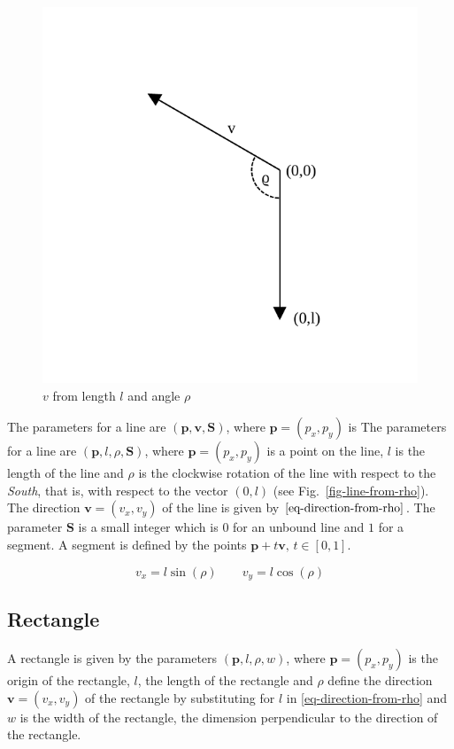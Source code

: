 \documentclass[11pt]{article}
\newcommand{\pb}{\mathbf{p}}
\newcommand{\Sb}{\mathbf{S}}
\newcommand{\vb}{\mathbf{v}}
\newcommand{\figref}[1]{Fig.~\eqref{#1}}
\begin{document}
\begin{figure}
    \centering
    \includegraphics[trim=0 20 0 80]{odg/line-from-angle.pdf}
    \caption{$v$ from length $l$ and angle $\rho$}\label{fig-line-from-rho}
\end{figure}
The parameters for a line are $(\pb, \vb, \Sb)$, where $\pb=(p_{x}, p_{y})$ is
The parameters for a line are $(\pb, l, \rho, \Sb)$, where $\pb=(p_{x},
p_{y})$ is a point on the line, $l$ is the length of the line and $\rho$ is the clockwise rotation
of the line with respect to the \textsl{South}, that is, with respect to the
vector $(0, l)$ (see \figref{fig-line-from-rho}). The direction $\vb=(v_{x},
v_{y})$ of the line is given by $\eqref{eq-direction-from-rho}$. The
parameter $\Sb$ is a small integer which is $0$ for an unbound line and $1$
for a segment. A segment is defined by the points $\pb+t\vb,\,t\in[0,1]$.

\begin{equation}
    v_{x} = l\sin(\rho)\qquad v_{y} = l\cos(\rho) \label{eq-direction-from-rho}
\end{equation}
\subsection{Rectangle}
\label{sec-representation-rectangle}

A rectangle is given by the parameters $(\pb, l, \rho, w)$, where
$\pb=(p_{x}, p_{y})$ is the origin of the rectangle, $l$, the length of the
rectangle and $\rho$ define the
direction $\vb=(v_{x}, v_{y})$ of the rectangle by substituting for $l$ in
\eqref{eq-direction-from-rho} and $w$ is the width of the rectangle, the
dimension perpendicular to the direction of the rectangle.
\end{document}
